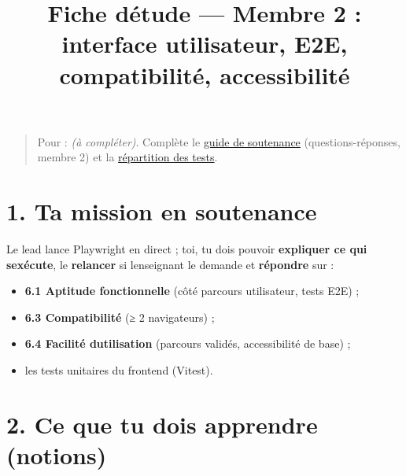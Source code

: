 \documentclass[
  11pt,
]{article}
\title{Fiche d\textquotesingle étude --- Membre 2 : interface
utilisateur, E2E, compatibilité, accessibilité}
\author{}
\date{}
\providecommand{\tightlist}{%
  \setlength{\itemsep}{0pt}\setlength{\parskip}{0pt}}
\let\tdmorigine\tableofcontents
\renewcommand{\tableofcontents}{\tdmorigine\newpage}
\begin{document}
\maketitle

\renewcommand*\contentsname{Table des matières}
{
\hypersetup{linkcolor=}
\setcounter{tocdepth}{3}
\tableofcontents
}
\begin{quote}
Pour : \emph{(à compléter)}. Complète le \href{SOUTENANCE.pdf}{guide de
soutenance} (questions-réponses, membre 2) et la
\href{REPARTITION_TESTS.pdf}{répartition des tests}.
\end{quote}

\section{1. Ta mission en soutenance}\label{1-ta-mission-en-soutenance}

Le lead lance Playwright en direct ; toi, tu dois pouvoir
\textbf{expliquer ce qui s\textquotesingle exécute}, le
\textbf{relancer} si l\textquotesingle enseignant le demande et
\textbf{répondre} sur :

\begin{itemize}
\tightlist
\item
  \textbf{6.1 Aptitude fonctionnelle} (côté parcours utilisateur, tests
  E2E) ;
\item
  \textbf{6.3 Compatibilité} (≥ 2 navigateurs) ;
\item
  \textbf{6.4 Facilité d\textquotesingle utilisation} (parcours validés,
  accessibilité de base) ;
\item
  les tests unitaires du frontend (Vitest).
\end{itemize}

\section{2. Ce que tu dois apprendre
(notions)}\label{2-ce-que-tu-dois-apprendre-notions}
\end{document}
